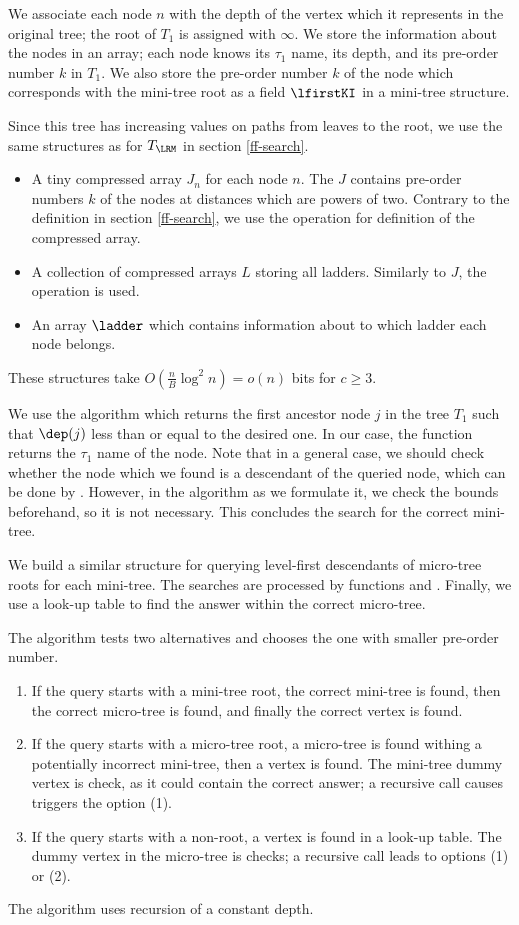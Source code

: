 We associate each node $n$ with the depth of the vertex which it represents in the original tree; the root of $T_1$ is assigned with $\infty$.
We store the information about the nodes in an array; each node knows its $\tau_1$ name, its depth, and its pre-order number $k$ in $T_1$.
We also store the pre-order number $k$ of the node which corresponds with the mini-tree root as a field $\lfirstKI$ in a mini-tree structure.

Since this tree has increasing values on paths from leaves to the root, we use the same structures as for $T_{\LRM}$ in section \ref{ff-search}.
\begin{itemize}
	\item A tiny compressed array $J_n$ for each node $n$.
	The $J$ contains pre-order numbers $k$ of the nodes at distances which are powers of two.
	Contrary to the definition in section \ref{ff-search}, we use the operation \pred{} for definition of the compressed array.
	\item A collection of compressed arrays $L$ storing all ladders.
	Similarly to $J$, the operation \pred{} is used.
	\item An array $\ladder$ which contains information about to which ladder each node belongs.
\end{itemize}
These structures take $O(\frac{n}{B} \log^2 n) = o(n)$ bits for $c \ge 3$.

We use the algorithm \LRMSearch{} which returns the first ancestor node $j$ in the tree $T_1$ such that $\dep(j)$ less than or equal to the desired one.
In our case, the function returns the $\tau_1$ name of the node.
Note that in a general case, we should check whether the node which we found is a descendant of the queried node, which can be done by \isAncestor{}.
However, in the algorithm as we formulate it, we check the bounds beforehand, so it is not necessary.
This concludes the search for the correct mini-tree.

We build a similar structure for querying level-first descendants of micro-tree roots for each mini-tree.
The searches are processed by functions \ldSearchI{} and \ldSearchII{}.
Finally, we use a look-up table to find the answer within the correct micro-tree.

The algorithm tests two alternatives and chooses the one with smaller pre-order number.
\begin{enumerate}
	\item If the query starts with a mini-tree root, the correct mini-tree is found, then the correct micro-tree is found, and finally the correct vertex is found.
	\item If the query starts with a micro-tree root, a micro-tree is found withing a potentially incorrect mini-tree, then a vertex is found.
	The mini-tree dummy vertex is check, as it could contain the correct answer; a recursive call causes triggers the option (1).
	\item If the query starts with a non-root, a vertex is found in a look-up table.
	The dummy vertex in the micro-tree is checks; a recursive call leads to options (1) or (2).
\end{enumerate}
The algorithm uses recursion of a constant depth.


